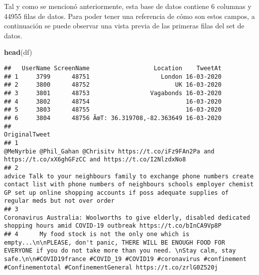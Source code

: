 \documentclass[
]{article}
\newenvironment{Shaded}{\begin{snugshade}}{\end{snugshade}}
\newcommand{\KeywordTok}[1]{\textcolor[rgb]{0.13,0.29,0.53}{\textbf{#1}}}
\newcommand{\NormalTok}[1]{#1}
\begin{document}
Tal y como se mencionó anteriormente, esta base de datos contiene 6
columnas y 44955 filas de datos. Para poder tener una referencia de cómo
son estos campos, a continuación se puede observar una vista previa de
las primeras filas del set de datos.

\begin{Shaded}
\begin{Highlighting}[]
\KeywordTok{head}\NormalTok{(df)}
\end{Highlighting}
\end{Shaded}

\begin{verbatim}
##   UserName ScreenName                  Location    TweetAt
## 1     3799      48751                    London 16-03-2020
## 2     3800      48752                        UK 16-03-2020
## 3     3801      48753                 Vagabonds 16-03-2020
## 4     3802      48754                           16-03-2020
## 5     3803      48755                           16-03-2020
## 6     3804      48756 ÃœT: 36.319708,-82.363649 16-03-2020
##                                                                                                                                                                                                                                                                                                        OriginalTweet
## 1                                                                                                                                                                                                    @MeNyrbie @Phil_Gahan @Chrisitv https://t.co/iFz9FAn2Pa and https://t.co/xX6ghGFzCC and https://t.co/I2NlzdxNo8
## 2                                                                      advice Talk to your neighbours family to exchange phone numbers create contact list with phone numbers of neighbours schools employer chemist GP set up online shopping accounts if poss adequate supplies of regular meds but not over order
## 3                                                                                                                                                                                Coronavirus Australia: Woolworths to give elderly, disabled dedicated shopping hours amid COVID-19 outbreak https://t.co/bInCA9Vp8P
## 4      My food stock is not the only one which is empty...\n\nPLEASE, don't panic, THERE WILL BE ENOUGH FOOD FOR EVERYONE if you do not take more than you need. \nStay calm, stay safe.\n\n#COVID19france #COVID_19 #COVID19 #coronavirus #confinement #Confinementotal #ConfinementGeneral https://t.co/zrlG0Z520j

\end{verbatim}
\end{document}
